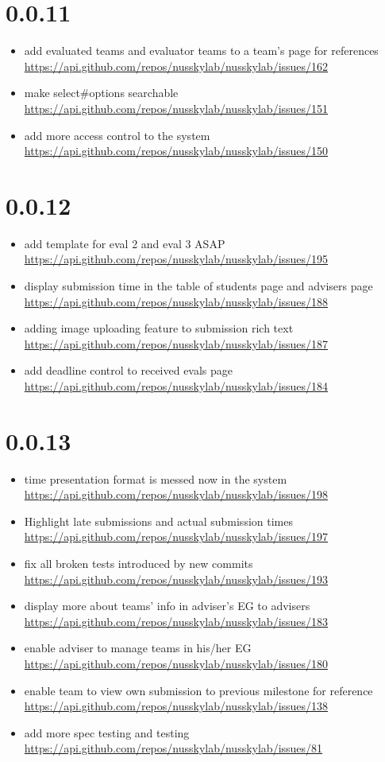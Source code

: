 {\section{0.0.11}
\begin{itemize}[noitemsep]
    \item add evaluated teams and evaluator teams to a team's page for references \url{https://api.github.com/repos/nusskylab/nusskylab/issues/162} 
    \item make select\#options searchable \url{https://api.github.com/repos/nusskylab/nusskylab/issues/151} 
    \item add more access control to the system \url{https://api.github.com/repos/nusskylab/nusskylab/issues/150} 
\end{itemize}

\section{0.0.12}
\begin{itemize}[noitemsep]
    \item add template for eval 2 and eval 3 ASAP \url{https://api.github.com/repos/nusskylab/nusskylab/issues/195} 
    \item display submission time in the table of students page and advisers page \url{https://api.github.com/repos/nusskylab/nusskylab/issues/188} 
    \item adding image uploading feature to submission rich text \url{https://api.github.com/repos/nusskylab/nusskylab/issues/187} 
    \item add deadline control to received evals page \url{https://api.github.com/repos/nusskylab/nusskylab/issues/184} 
\end{itemize}

\section{0.0.13}
\begin{itemize}[noitemsep]
    \item time presentation format is messed now in the system \url{https://api.github.com/repos/nusskylab/nusskylab/issues/198} 
    \item Highlight late submissions and actual submission times \url{https://api.github.com/repos/nusskylab/nusskylab/issues/197} 
    \item fix all broken tests introduced by new commits \url{https://api.github.com/repos/nusskylab/nusskylab/issues/193} 
    \item display more about teams' info in adviser's EG to advisers \url{https://api.github.com/repos/nusskylab/nusskylab/issues/183} 
    \item enable adviser to manage teams in his/her EG \url{https://api.github.com/repos/nusskylab/nusskylab/issues/180} 
    \item enable team to view own submission to previous milestone for reference \url{https://api.github.com/repos/nusskylab/nusskylab/issues/138} 
    \item add more spec testing and testing \url{https://api.github.com/repos/nusskylab/nusskylab/issues/81} 
\end{itemize}

}
